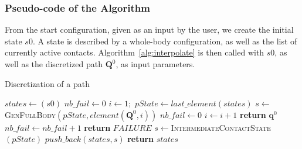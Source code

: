 \subsubsection{Pseudo-code of the Algorithm}
\label{app:contact}



From the start configuration, given as an input by the user,
we create the initial state $s0$. A state is described by a whole-body configuration, as well as the list of currently active contacts.
Algorithm~\ref{alg:interpolate}  is then called with $s0$, as well as the discretized path 
$\mathbf{Q}^0$, as input parameters.

\begin{algorithm}[!tbp]
\caption{Discretization of a path} \label{interpolate}
	\begin{algorithmic}[1]
		\State $states \gets (s0)$ 
		\State $nb\_fail \gets 0$ 
		\State $i \gets 1;$ 
			\State $pState \gets last\_element(states)$
			\State $s \gets$ \textsc{GenFullBody}$(pState, element(\mathbf{Q}^0,i))$
				\State $nb\_fail \gets 0$
				\State $i \gets i+1$
				\State \textbf{return} $\mathbf{q}^{0}$
			\Else
				\State $nb\_fail \gets nb\_fail + 1$
					\State \textbf{return} $FAILURE$
				\EndIf				
				\State $s \gets $\textsc{IntermediateContactState}$(pState)$
			\EndIf
			\State $push\_back(states, s)$
		\EndWhile
		\State \textbf{return} $states$
	\EndFunction
\end{algorithmic}
\label{alg:interpolate}
\end{algorithm}


